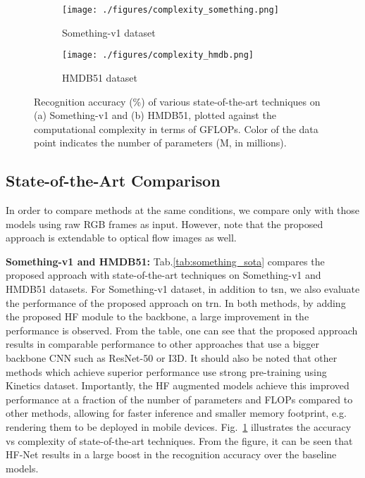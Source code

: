 \documentclass[journal,onecolumn]{IEEEtran}
\begin{document}
\begin{figure}[t]\centering
    \begin{subfigure}[b]{.45\textwidth}\hspace{-6.5mm}
    \texttt{[image: ./figures/complexity\_something.png]}
    \caption{Something-v1 dataset}
    \label{fig:complexity_something}
    \end{subfigure}
    \begin{subfigure}[b]{.45\textwidth}\hspace{1.5mm}
    \texttt{[image: ./figures/complexity\_hmdb.png]}
    \caption{HMDB51 dataset}
    \label{fig:complexity_hmdb}
    \end{subfigure}
    \caption{Recognition accuracy (\%) of various state-of-the-art techniques on (a) Something-v1 and (b) HMDB51, plotted against the computational complexity in terms of GFLOPs. Color of the data point indicates the number of parameters (M, in millions).}
    \label{fig:complexity}
\end{figure}



\subsection{State-of-the-Art Comparison}

In order to compare methods at the same conditions, we compare only with those models using raw RGB frames as input. However, note that the proposed approach is extendable to optical flow images as well.

{\noindent \textbf{Something-v1 and HMDB51:}} Tab.\ref{tab:something_sota} compares the proposed approach with state-of-the-art techniques on Something-v1 and HMDB51 datasets. For Something-v1 dataset, in addition to \ac{tsn}, we also evaluate the performance of the proposed approach on \ac{trn}. In both methods, by adding the proposed HF module to the backbone, a large improvement in the performance is observed. From the table, one can see that the proposed approach results in comparable performance to other approaches that use a bigger backbone CNN such as ResNet-50 or I3D. It should also be noted that other methods which achieve superior performance use strong pre-training using Kinetics dataset. Importantly, the HF augmented models achieve this improved performance at a fraction of the number of parameters and FLOPs compared to other methods, allowing for faster inference and smaller memory footprint, e.g. rendering them to be deployed in mobile devices. Fig.~\ref{fig:complexity_something} illustrates the accuracy vs complexity of state-of-the-art techniques. From the figure, it can be seen that HF-Net results in a large boost in the recognition accuracy over the baseline models. 
\end{document}
